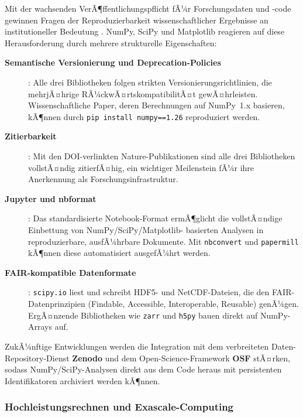 \documentclass[12pt, a4paper]{article}
\begin{document}
Mit der wachsenden VerÃ¶ffentlichungspflicht fÃ¼r Forschungsdaten und
-code gewinnen Fragen der Reproduzierbarkeit wissenschaftlicher Ergebnisse
an institutioneller Bedeutung \cite{donoho2010invitation, peng2011reproducible}.
NumPy, SciPy und Matplotlib reagieren auf diese Herausforderung durch
mehrere strukturelle Eigenschaften:

\begin{description}
  \item[\textbf{Semantische Versionierung und Deprecation-Policies}]:
    Alle drei Bibliotheken folgen strikten Versionierungsrichtlinien, die
    mehrjÃ¤hrige RÃ¼ckwÃ¤rtskompatibilitÃ¤t gewÃ¤hrleisten. Wissenschaftliche
    Paper, deren Berechnungen auf NumPy~1.x basieren, kÃ¶nnen durch
    \texttt{pip install numpy==1.26} reproduziert werden.

  \item[\textbf{Zitierbarkeit}]: Mit den DOI-verlinkten Nature-Publikationen
    \cite{harris2020array, virtanen2020scipy, hunter2007matplotlib} sind
    alle drei Bibliotheken vollstÃ¤ndig zitierfÃ¤hig, ein wichtiger Meilenstein
    fÃ¼r ihre Anerkennung als Forschungsinfrastruktur.

  \item[\textbf{Jupyter und nbformat}]: Das standardisierte Notebook-Format
    ermÃ¶glicht die vollstÃ¤ndige Einbettung von NumPy/SciPy/Matplotlib-
    basierten Analysen in reproduzierbare, ausfÃ¼hrbare Dokumente. Mit
    \texttt{nbconvert} und \texttt{papermill} kÃ¶nnen diese automatisiert
    ausgefÃ¼hrt werden.

  \item[\textbf{FAIR-kompatible Datenformate}]: \texttt{scipy.io} liest und
    schreibt HDF5- und NetCDF-Dateien, die den FAIR-Datenprinzipien
    (Findable, Accessible, Interoperable, Reusable) genÃ¼gen.
    ErgÃ¤nzende Bibliotheken wie \texttt{zarr} und \texttt{h5py} bauen
    direkt auf NumPy-Arrays auf.
\end{description}

ZukÃ¼nftige Entwicklungen werden die Integration mit dem verbreiteten
Daten-Repository-Dienst \textbf{Zenodo} und dem Open-Science-Framework
\textbf{OSF} stÃ¤rken, sodass NumPy/SciPy-Analysen direkt aus dem Code
heraus mit persistenten Identifikatoren archiviert werden kÃ¶nnen.

\subsubsection{Hochleistungsrechnen und Exascale-Computing}
\label{subsubsec:hpc}
\end{document}

